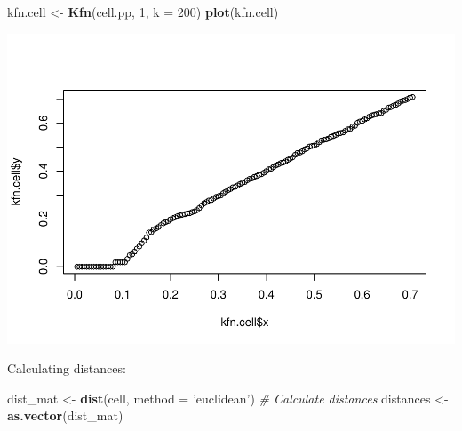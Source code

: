 \documentclass[
]{article}
\newenvironment{Shaded}{\begin{snugshade}}{\end{snugshade}}
\newcommand{\CommentTok}[1]{\textcolor[rgb]{0.56,0.35,0.01}{\textit{#1}}}
\newcommand{\DataTypeTok}[1]{\textcolor[rgb]{0.13,0.29,0.53}{#1}}
\newcommand{\DecValTok}[1]{\textcolor[rgb]{0.00,0.00,0.81}{#1}}
\newcommand{\KeywordTok}[1]{\textcolor[rgb]{0.13,0.29,0.53}{\textbf{#1}}}
\newcommand{\NormalTok}[1]{#1}
\newcommand{\OperatorTok}[1]{\textcolor[rgb]{0.81,0.36,0.00}{\textbf{#1}}}
\newcommand{\StringTok}[1]{\textcolor[rgb]{0.31,0.60,0.02}{#1}}
\begin{document}
\begin{Shaded}
\end{Shaded}

\begin{Shaded}
\begin{Highlighting}[]
\NormalTok{kfn.cell <-}\StringTok{ }\KeywordTok{Kfn}\NormalTok{(cell.pp, }\DecValTok{1}\NormalTok{, }\DataTypeTok{k =} \DecValTok{200}\NormalTok{)}
\KeywordTok{plot}\NormalTok{(kfn.cell)}
\end{Highlighting}
\end{Shaded}

\includegraphics{project2_files/figure-latex/unnamed-chunk-21-1.pdf}

Calculating distances:

\begin{Shaded}
\begin{Highlighting}[]
\NormalTok{dist_mat <-}\StringTok{ }\KeywordTok{dist}\NormalTok{(cell, }\DataTypeTok{method =} \StringTok{'euclidean'}\NormalTok{) }\CommentTok{# Calculate distances}
\NormalTok{distances <-}\StringTok{ }\KeywordTok{as.vector}\NormalTok{(dist_mat)}
\end{Highlighting}
\end{Shaded}
\end{document}
